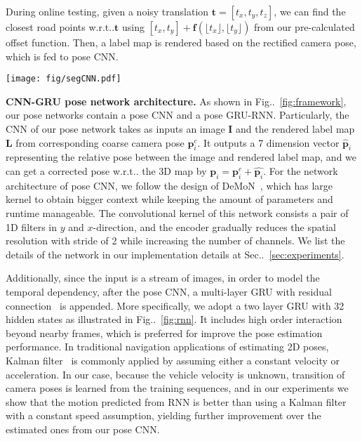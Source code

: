 \documentclass[10pt,twocolumn,letterpaper]{article}
\makeatletter
\newcommand{\figref}[1]{Fig\onedot~\ref{#1}}
\newcommand{\secref}[1]{Sec\onedot~\ref{#1}}
\newcommand{\ve}[1]{{\mathbf #1}} %
\DeclareRobustCommand\onedot{\futurelet\@let@token\@onedot}
\def\onedot{\ifx\@let@token.\else.\null\fi\xspace}
\def\wrt{w.r.t\onedot}
\makeatother
\begin{document}
During online testing, given a noisy translation $\ve{t}=[t_x, t_y, t_z]$, we can find the closest road points \wrt$\ve{t}$ using $[t_x, t_y] + \ve{f}(\lfloor t_x \rfloor, \lfloor t_y \rfloor)$ from our pre-calculated offset function. Then, a label map is rendered based on the rectified camera pose, which is fed to pose CNN.

\begin{figure*}[t]
\center
\vspace{-0.6\baselineskip}
\texttt{[image: fig/segCNN.pdf]}
\caption{Architecture of the segment CNN with rendered label map as a segmentation priori. At bottom of each convolutional block, we show the filter size, and at top we mark the downsample rates of each block \wrt the input image size. The 'softmax' text box indicates the places a loss is calculated. Details are in \secref{subsec:parsing}.}
\label{fig:segnet}
\vspace{-1.35\baselineskip}
\end{figure*}\textbf{CNN-GRU pose network architecture.}
As shown in \figref{fig:framework}, our pose networks contain a pose CNN and a pose GRU-RNN. Particularly,
the CNN of our pose network takes as inputs an image $\ve{I}$ and the rendered label map $\ve{L}$ from corresponding coarse camera pose $\ve{p}_i^c$. It outputs a 7 dimension vector $\hat{\ve{p}}_i$ representing the relative pose between the image and rendered label map, and we can get a corrected pose \wrt the 3D map by $\ve{p}_i = \ve{p}_i^c + \hat{\ve{p}_i}$.
For the network architecture of pose CNN, we follow the design of DeMoN~\cite{ummenhofer2016demon}, which has large kernel to obtain bigger context while keeping the amount of parameters and runtime manageable. The convolutional kernel of this network consists a pair of 1D filters in $y$ and $x$-direction, and the encoder gradually reduces the spatial resolution with stride of 2 while increasing the number of channels. We list the details of the network in our implementation details at \secref{sec:experiments}.

Additionally, since the input is a stream of images, in order to model the temporal dependency,
after the pose CNN, a multi-layer GRU with residual connection~\cite{wu2016google} is appended.
More specifically, we adopt a two layer GRU with 32 hidden states as illustrated in \figref{fig:rnn}. It includes high order interaction beyond nearby frames, which is preferred for improve the pose estimation performance.
In traditional navigation applications of estimating 2D poses,  Kalman filter~\cite{kalman1960new} is commonly applied by assuming either a constant velocity or acceleration.
In our case, because the vehicle velocity is unknown, transition of camera poses is learned from the training sequences, and in our experiments we show that the motion predicted from RNN is better than using a Kalman filter with a constant speed assumption, yielding further improvement over the estimated ones from our pose CNN.
\end{document}
